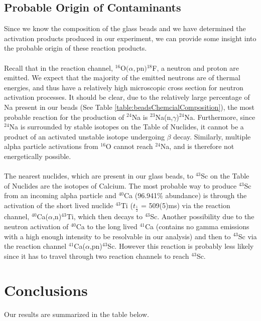 \documentclass[]{article}
\begin{document}
\subsection{Probable Origin of Contaminants}
Since we know the composition of the glass beads and we have determined the activation products produced in our experiment, we can provide some insight into the probable origin of these reaction products.\\\\
Recall that in the reaction channel, ${}^{16}$O$(\alpha,$pn$){}^{18}$F, a neutron and proton are emitted. We expect that the majority of the emitted neutrons are of thermal energies, and thus have a relatively high microscopic cross section for neutron activation processes. It should be clear, due to the relatively large percentage of Na present in our beads (See Table \ref{table:beadsChemcialComposition}), the most probable reaction for the production of ${}^{24}$Na is ${}^{23}$Na(n,$\gamma$)${}^{24}$Na. Furthermore, since ${}^{24}$Na is surrounded by stable isotopes on the Table of Nuclides, it cannot be a product of an activated unstable isotope undergoing $\beta$ decay. Similarly, multiple alpha particle activations from ${}^{16}$O cannot reach ${}^{24}$Na, and is therefore not energetically possible.\\\\
The nearest nuclides, which are present in our glass beads, to ${}^{43}$Sc on the Table of Nuclides are the isotopes of Calcium. The most probable way to produce ${}^{43}$Sc from an incoming alpha particle and ${}^{40}$Ca (96.941$\%$ abundance) is through the activation of the short lived nuclide ${}^{43}$Ti ($t_{\frac{1}{2}}$ = 509(5)ms) via the reaction channel, ${}^{40}$Ca($\alpha$,n)${}^{43}$Ti, which then decays to ${}^{43}$Sc. Another possibility due to the neutron activation of ${}^{40}$Ca to the long lived ${}^{41}$Ca (contains no gamma emissions with a high enough intensity to be resolvable in our analysis) and then to ${}^{43}$Sc via the reaction channel ${}^{41}$Ca($\alpha$,pn)${}^{43}$Sc. However this reaction is probably less likely since it has to travel through two reaction channels to reach ${}^{43}$Sc.
\section{Conclusions}
Our results are summarized in the table below.
\end{document}
